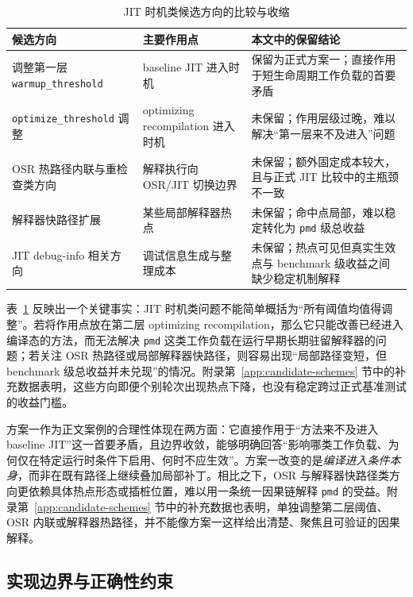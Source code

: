 \begin{table}[htbp]
    \centering
    \small
    \caption{JIT 时机类候选方向的比较与收缩}
    \label{tab:jittiming-candidates}
    \begin{tabular}{>{\raggedright\arraybackslash}p{3.1cm}>{\raggedright\arraybackslash}p{3.4cm}>{\raggedright\arraybackslash}p{5.0cm}}
        \hline
        \textbf{候选方向} & \textbf{主要作用点} & \textbf{本文中的保留结论} \\
        \hline
        调整第一层 \texttt{warmup\_threshold} & baseline JIT 进入时机 & 保留为正式方案一；直接作用于短生命周期工作负载的首要矛盾 \\
        \texttt{optimize\_threshold} 调整 & optimizing recompilation 进入时机 & 未保留；作用层级过晚，难以解决“第一层来不及进入”问题 \\
        OSR 热路径内联与重检查类方向 & 解释执行向 OSR/JIT 切换边界 & 未保留；额外固定成本较大，且与正式 JIT 比较中的主瓶颈不一致 \\
        解释器快路径扩展 & 某些局部解释器热点 & 未保留；命中点局部，难以稳定转化为 \texttt{pmd} 级总收益 \\
        JIT debug-info 相关方向 & 调试信息生成与整理成本 & 未保留；热点可见但真实生效点与 benchmark 级收益之间缺少稳定机制解释 \\
        \hline
    \end{tabular}
\end{table}

表~\ref{tab:jittiming-candidates} 反映出一个关键事实：JIT 时机类问题不能简单概括为“所有阈值均值得调整”。若将作用点放在第二层 optimizing recompilation，那么它只能改善已经进入编译态的方法，而无法解决 \texttt{pmd} 这类工作负载在运行早期长期驻留解释器的问题；若关注 OSR 热路径或局部解释器快路径，则容易出现“局部路径变短，但 benchmark 级总收益并未兑现”的情况。附录第~\ref{app:candidate-schemes} 节中的补充数据表明，这些方向即便个别轮次出现热点下降，也没有稳定跨过正式基准测试的收益门槛。

方案一作为正文案例的合理性体现在两方面：它直接作用于“方法来不及进入 baseline JIT”这一首要矛盾，且边界收敛，能够明确回答“影响哪类工作负载、为何仅在特定运行时条件下启用、何时不应生效”。方案一改变的是\emph{编译进入条件本身}，而非在既有路径上继续叠加局部补丁。相比之下，OSR 与解释器快路径类方向更依赖具体热点形态或插桩位置，难以用一条统一因果链解释 \texttt{pmd} 的受益。附录第~\ref{app:candidate-schemes} 节中的补充数据也表明，单独调整第二层阈值、OSR 内联或解释器热路径，并不能像方案一这样给出清楚、聚焦且可验证的因果解释。

\subsection{实现边界与正确性约束}

